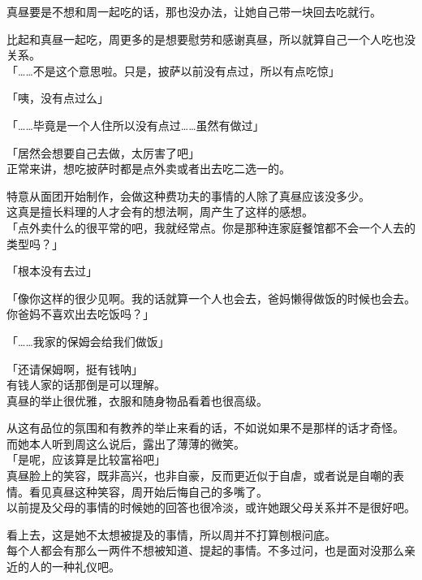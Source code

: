真昼要是不想和周一起吃的话，那也没办法，让她自己带一块回去吃就行。

比起和真昼一起吃，周更多的是想要慰劳和感谢真昼，所以就算自己一个人吃也没关系。\\

「……不是这个意思啦。只是，披萨以前没有点过，所以有点吃惊」

「咦，没有点过么」

「……毕竟是一个人住所以没有点过……虽然有做过」

「居然会想要自己去做，太厉害了吧」\\

正常来讲，想吃披萨时都是点外卖或者出去吃二选一的。

特意从面团开始制作，会做这种费功夫的事情的人除了真昼应该没多少。\\

这真是擅长料理的人才会有的想法啊，周产生了这样的感想。\\

「点外卖什么的很平常的吧，我就经常点。你是那种连家庭餐馆都不会一个人去的类型吗？」

「根本没有去过」

「像你这样的很少见啊。我的话就算一个人也会去，爸妈懒得做饭的时候也会去。你爸妈不喜欢出去吃饭吗？」

「……我家的保姆会给我们做饭」

「还请保姆啊，挺有钱呐」\\

有钱人家的话那倒是可以理解。\\

真昼的举止很优雅，衣服和随身物品看着也很高级。

从这有品位的氛围和有教养的举止来看的话，不如说如果不是那样的话才奇怪。\\

而她本人听到周这么说后，露出了薄薄的微笑。\\

「是呢，应该算是比较富裕吧」\\

真昼脸上的笑容，既非高兴，也非自豪，反而更近似于自虐，或者说是自嘲的表情。看见真昼这种笑容，周开始后悔自己的多嘴了。\\

以前提及父母的事情的时候她的回答也很冷淡，或许她跟父母关系并不是很好吧。

看上去，这是她不太想被提及的事情，所以周并不打算刨根问底。\\

每个人都会有那么一两件不想被知道、提起的事情。不多过问，也是面对没那么亲近的人的一种礼仪吧。\\

